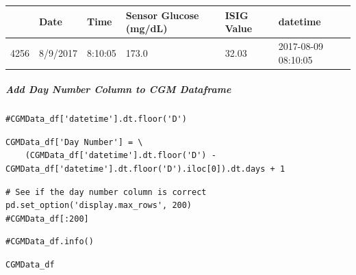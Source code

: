 \bigskip\noindent
\begin{tabular}{p{}p{}p{}p{}p{}p{}}
\toprule
 & Date & Time & Sensor Glucose (mg/dL) & ISIG Value & datetime \\
\hline
4256 & 8/9/2017 & 8:10:05 & 173.0 & 32.03 & 2017-08-09 08:10:05 \\
\hline
\bottomrule
\end{tabular}

\bigskip

\subparagraph{Add Day Number Column to CGM Dataframe}

\begin{verbatim}
#CGMData_df['datetime'].dt.floor('D')
\end{verbatim}

\begin{verbatim}
CGMData_df['Day Number'] = \
    (CGMData_df['datetime'].dt.floor('D') - CGMData_df['datetime'].dt.floor('D').iloc[0]).dt.days + 1
\end{verbatim}

\begin{verbatim}
# See if the day number column is correct
pd.set_option('display.max_rows', 200)
#CGMData_df[:200]
\end{verbatim}

\begin{verbatim}
#CGMData_df.info()
\end{verbatim}

\begin{verbatim}
CGMData_df
\end{verbatim}

